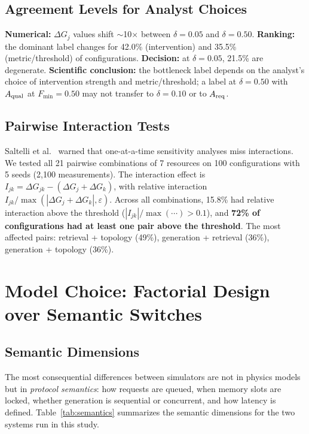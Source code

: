 \documentclass{ams-journal}
\newcommand{\DG}{\Delta G}
\newcommand{\Areq}{A_{\rm req}}
\newcommand{\Aqual}{A_{\rm qual}}
\begin{document}
\subsection{Agreement Levels for Analyst Choices}

\textbf{Numerical:} $\DG_j$ values shift $\sim$10$\times$ between $\delta = 0.05$ and $\delta = 0.50$. \textbf{Ranking:} the dominant label changes for 42.0\% (intervention) and 35.5\% (metric/threshold) of configurations. \textbf{Decision:} at $\delta = 0.05$, 21.5\% are degenerate. \textbf{Scientific conclusion:} the bottleneck label depends on the analyst's choice of intervention strength and metric/threshold; a label at $\delta = 0.50$ with $\Aqual$ at $F_{\min} = 0.50$ may not transfer to $\delta = 0.10$ or to $\Areq$.

\subsection{Pairwise Interaction Tests}

Saltelli et al.~\cite{saltelli2019why} warned that one-at-a-time sensitivity analyses miss interactions. We tested all 21 pairwise combinations of 7 resources on 100 configurations with 5 seeds (2,100 measurements). The interaction effect is $I_{jk} = \DG_{jk} - (\DG_j + \DG_k)$, with relative interaction $I_{jk} / \max(|\DG_j + \DG_k|, \varepsilon)$. Across all combinations, 15.8\% had relative interaction above the threshold ($|I_{jk}|/\max(\cdots) > 0.1$), and \textbf{72\% of configurations had at least one pair above the threshold}. The most affected pairs: retrieval + topology (49\%), generation + retrieval (36\%), generation + topology (36\%).

\section{Model Choice: Factorial Design over Semantic Switches}
\label{sec:model_choice}

\subsection{Semantic Dimensions}

The most consequential differences between simulators are not in physics models but in \emph{protocol semantics}: how requests are queued, when memory slots are locked, whether generation is sequential or concurrent, and how latency is defined. Table~\ref{tab:semantics} summarizes the semantic dimensions for the two systems run in this study.
\end{document}
